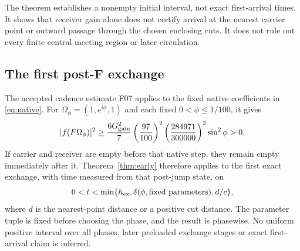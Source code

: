The theorem establishes a nonempty initial interval, not exact first-arrival times. It shows that receiver gain alone does not certify arrival at the nearest carrier point or outward passage through the chosen enclosing cuts. It does not rule out every finite central meeting region or later circulation.

\subsection{The first post-F exchange}\label{sec:postF}
The accepted cadence estimate F07 \cite{F} applies to the fixed native coefficients in \eqref{eq:native}. For $\Omega_\phi=(1,e^{i\phi},1)$ and each fixed $0<\phi\le1/100$, it gives
\begin{equation}\label{eq:F07}
 |f(F\Omega_\phi)|^2\ge
 \frac{6G_{\rm gain}^2}{7}\left(\frac{97}{100}\right)^2
 \left(\frac{284971}{300000}\right)^2\sin^2\phi>0.
\end{equation}
If carrier and receiver are empty before that native step, they remain empty immediately after it. Theorem~\ref{thm:early} therefore applies to the first exact exchange, with time measured from that post-jump state, on
\begin{equation}\label{eq:postFinterval}
 0<t<\min\{h_{\rm ex},\delta(\phi,\text{fixed parameters}),d/c\},
\end{equation}
where $d$ is the nearest-point distance or a positive cut distance. The parameter tuple is fixed before choosing the phase, and the result is phasewise. No uniform positive interval over all phases, later preloaded exchange stages or exact first-arrival claim is inferred.
